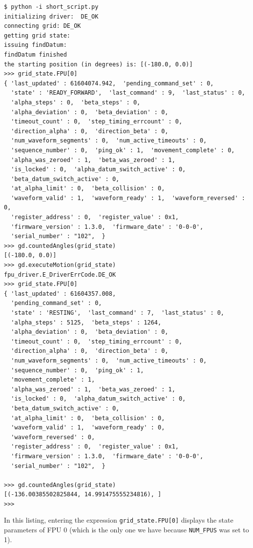 \documentclass[11pt,a4paper]{report}
\begin{document}
\begin{verbatim}
$ python -i short_script.py
initializing driver:  DE_OK
connecting grid: DE_OK
getting grid state:
issuing findDatum:
findDatum finished
the starting position (in degrees) is: [(-180.0, 0.0)]
>>> grid_state.FPU[0]
{ 'last_updated' : 61604074.942,  'pending_command_set' : 0,
  'state' : 'READY_FORWARD',  'last_command' : 9,  'last_status' : 0,
  'alpha_steps' : 0,  'beta_steps' : 0,
  'alpha_deviation' : 0,  'beta_deviation' : 0,
  'timeout_count' : 0,  'step_timing_errcount' : 0,
  'direction_alpha' : 0,  'direction_beta' : 0,
  'num_waveform_segments' : 0,  'num_active_timeouts' : 0,
  'sequence_number' : 0,  'ping_ok' : 1,  'movement_complete' : 0,
  'alpha_was_zeroed' : 1,  'beta_was_zeroed' : 1,
  'is_locked' : 0,  'alpha_datum_switch_active' : 0,
  'beta_datum_switch_active' : 0,
  'at_alpha_limit' : 0,  'beta_collision' : 0,
  'waveform_valid' : 1,  'waveform_ready' : 1,  'waveform_reversed' : 0,
  'register_address' : 0,  'register_value' : 0x1,
  'firmware_version' : 1.3.0,  'firmware_date' : '0-0-0',
  'serial_number' : "102",  }
>>> gd.countedAngles(grid_state)
[(-180.0, 0.0)]
>>> gd.executeMotion(grid_state)
fpu_driver.E_DriverErrCode.DE_OK
>>> grid_state.FPU[0]
{ 'last_updated' : 61604357.008,
  'pending_command_set' : 0,
  'state' : 'RESTING',  'last_command' : 7,  'last_status' : 0,
  'alpha_steps' : 5125,  'beta_steps' : 1264,
  'alpha_deviation' : 0,  'beta_deviation' : 0,
  'timeout_count' : 0,  'step_timing_errcount' : 0,
  'direction_alpha' : 0,  'direction_beta' : 0,
  'num_waveform_segments' : 0,  'num_active_timeouts' : 0,
  'sequence_number' : 0,  'ping_ok' : 1,
  'movement_complete' : 1,
  'alpha_was_zeroed' : 1,  'beta_was_zeroed' : 1,
  'is_locked' : 0,  'alpha_datum_switch_active' : 0,
  'beta_datum_switch_active' : 0,
  'at_alpha_limit' : 0,  'beta_collision' : 0,
  'waveform_valid' : 1,  'waveform_ready' : 0,
  'waveform_reversed' : 0,
  'register_address' : 0,  'register_value' : 0x1,
  'firmware_version' : 1.3.0,  'firmware_date' : '0-0-0',
  'serial_number' : "102",  }

>>> gd.countedAngles(grid_state)
[(-136.00385502825844, 14.991475555234816), ]
>>>
\end{verbatim}

In this listing, entering the expression \verb+grid_state.FPU[0]+
displays the state parameters of FPU 0 (which is the only one we have
because \texttt{NUM\_FPUS} was set to 1).
\end{document}
